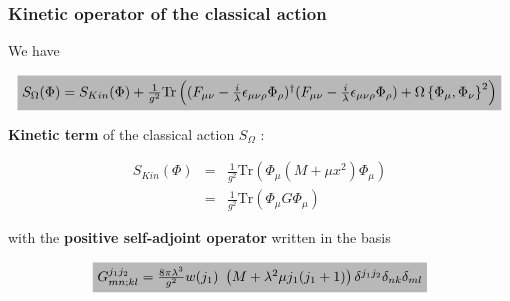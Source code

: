 \documentclass[9pt]{beamer}
\begin{document}
\begin{frame}

\frametitle{Kinetic operator of the classical action}

\vfill

We have

\begin{equation*}
\tikz[baseline]{\node[fill=black!28!white,anchor=base] (t1) {$S_\Omega(\Phi) = S_{Kin}(\Phi) + \frac{1}{g^2} \mbox{Tr}\left((F_{\mu\nu} - \frac{i}{\lambda} \epsilon_{\mu\nu\rho} \Phi_\rho)^\dag (F_{\mu\nu} - \frac{i}{\lambda} \epsilon_{\mu\nu\rho} \Phi_\rho) + \Omega\left\{\Phi_\mu,\Phi_\nu\right\}^2\right)
$};}
\end{equation*}

\vspace*{14pt}

\textbf{Kinetic term} of the classical action $S_\Omega$ :

\begin{eqnarray*}
S_{Kin}(\Phi) &=& \frac{1}{g^2} \mbox{Tr}\left( \Phi_\mu (M+\mu x^2) \Phi_\mu\right) \\
&=& \frac{1}{g^2} \mbox{Tr}\left( \Phi_\mu G \Phi_\mu\right)
\end{eqnarray*}

\vspace*{12pt}

with the \textbf{positive self-adjoint operator} written in the basis

\begin{equation*}
\tikz[baseline]{\node[fill=black!28!white,anchor=base] (t1) {$G^{j_1j_2}_{mn;kl} = \frac{8\pi\lambda^3}{g^2} w(j_1) \ \left(M+\lambda^2\mu j_1(j_1+1)\right) \delta^{j_1j_2} \delta_{nk} \delta_{ml}$};}
\end{equation*}


\vfill

\end{frame}

\end{document}
